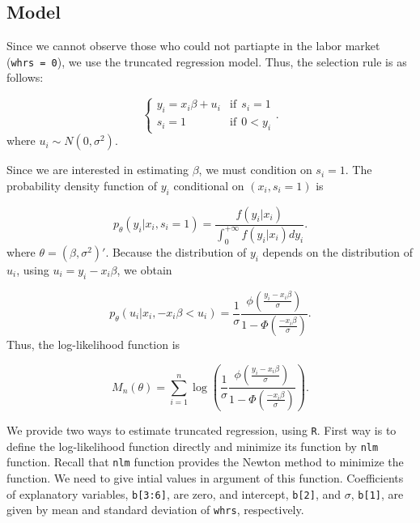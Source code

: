 \documentclass[
  12pt,
]{article}
\begin{document}
\hypertarget{model-2}{%
\subsection{Model}\label{model-2}}

Since we cannot observe those who could not partiapte in the labor
market (\texttt{whrs\ =\ 0}), we use the truncated regression model.
Thus, the selection rule is as follows:

\begin{equation*}
  \begin{cases}
    y_i = x_i \beta + u_i &\text{if}\:\: s_i = 1  \\
    s_i = 1 &\text{if}\:\: 0 < y_i
  \end{cases}.
\end{equation*} where \(u_i \sim N(0, \sigma^2)\).

Since we are interested in estimating \(\beta\), we must condition on
\(s_i = 1\). The probability density function of \(y_i\) conditional on
\((x_i, s_i = 1)\) is

\begin{equation*}
  p_{\theta}(y_i | x_i, s_i = 1) = \frac{f(y_i | x_i)}{\int_0^{+\infty} f(y_i | x_i) dy_i}.
\end{equation*} where \(\theta = (\beta, \sigma^2)'\). Because the
distribution of \(y_i\) depends on the distribution of \(u_i\), using
\(u_i = y_i - x_i \beta\), we obtain

\begin{equation*}
  p_{\theta}(u_i | x_i, -x_i \beta < u_i) 
  = \frac{1}{\sigma} \frac{\phi(\frac{y_i - x_i \beta}{\sigma})}{1 - \Phi(\frac{- x_i \beta}{\sigma})}.
\end{equation*} Thus, the log-likelihood function is

\begin{equation*}
  M_n(\theta) 
  = \sum_{i=1}^n \log \left( \frac{1}{\sigma} \frac{\phi(\frac{y_i - x_i \beta}{\sigma})}{1 - \Phi(\frac{- x_i \beta}{\sigma})} \right).
\end{equation*}

We provide two ways to estimate truncated regression, using \texttt{R}.
First way is to define the log-likelihood function directly and minimize
its function by \texttt{nlm} function. Recall that \texttt{nlm} function
provides the Newton method to minimize the function. We need to give
intial values in argument of this function. Coefficients of explanatory
variables, \texttt{b{[}3:6{]}}, are zero, and intercept,
\texttt{b{[}2{]}}, and \(\sigma\), \texttt{b{[}1{]}}, are given by mean
and standard deviation of \texttt{whrs}, respectively.
\end{document}
